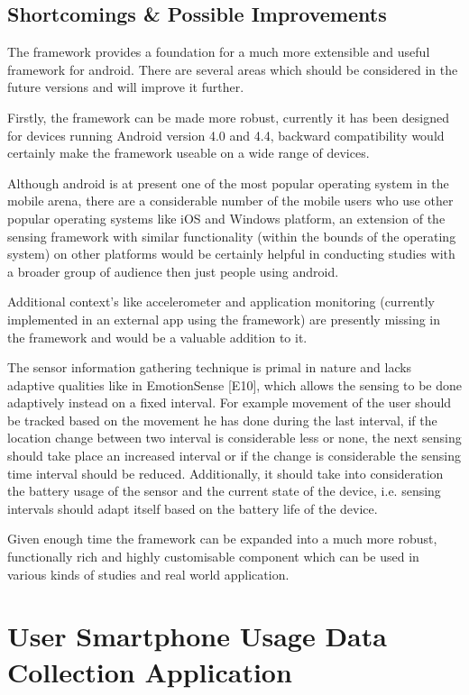 \documentclass[12pt]{report}
\begin{document}
\section{Shortcomings \& Possible Improvements}
\label{contextShortcomings}
The framework provides a foundation for a much more extensible and useful framework for android. There are several areas which should be considered in the future versions and will improve it further.

Firstly, the framework can be made more robust, currently it has been designed for devices running Android version 4.0 and 4.4, backward compatibility would certainly make the framework useable on a wide range of devices. 

Although android is at present one of the most popular operating system in the mobile arena, there are a considerable number of the mobile users who use other popular operating systems like iOS and Windows platform, an extension of the sensing framework with similar functionality (within the bounds of the operating system) on other platforms would be certainly helpful in conducting studies with a broader group of audience then just people using android.

Additional context's like accelerometer and application monitoring (currently implemented in an external app using the framework) are presently missing in the framework and would be a valuable addition to it.

The sensor information gathering technique is primal in nature and lacks adaptive qualities like in EmotionSense [E10], which allows the sensing to be done adaptively instead on a fixed interval. For example movement of the user should be tracked based on the movement he has done during the last interval, if the location change between two interval is considerable less or none, the next sensing should take place an increased interval or if the change is considerable the sensing time interval should be reduced. Additionally, it should take into consideration the battery usage of the sensor and the current state of the device, i.e. sensing intervals should adapt itself based on the battery life of the device.

Given enough time the framework can be expanded into a much more robust, functionally rich and highly customisable component which can be used in various kinds of studies and real world application. 

\chapter{User Smartphone Usage Data Collection Application}
\end{document}
